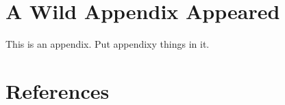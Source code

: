 \documentclass[12pt]{report} %
\begin{document}






\appendix
\chapter{A Wild Appendix Appeared}
\thispagestyle{fancy} %

This is an appendix. Put appendixy things in it.





\chapter*{References}
\thispagestyle{fancy} %
\end{document}
